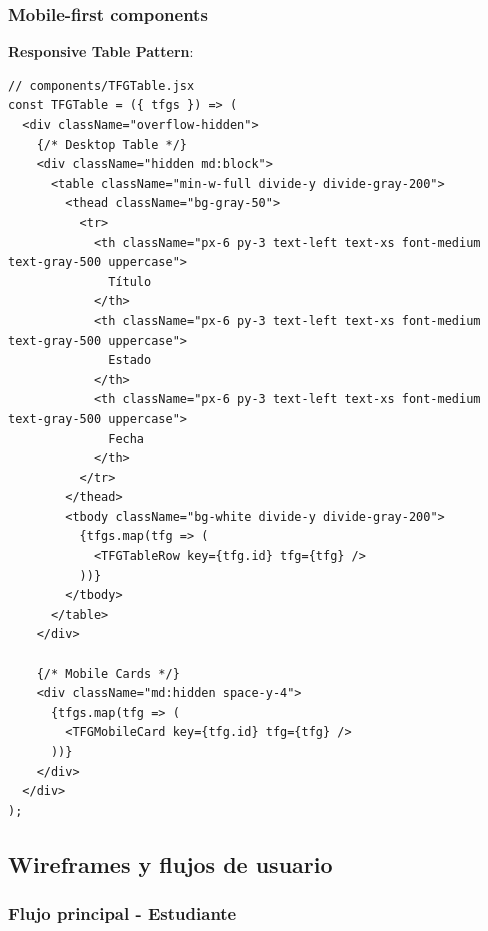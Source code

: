 \documentclass[12pt,a4paper,oneside]{report}
\begin{document}
\subsubsection{Mobile-first components}\label{mobile-first-components}

\textbf{Responsive Table Pattern}:

\begin{lstlisting}
// components/TFGTable.jsx
const TFGTable = ({ tfgs }) => (
  <div className="overflow-hidden">
    {/* Desktop Table */}
    <div className="hidden md:block">
      <table className="min-w-full divide-y divide-gray-200">
        <thead className="bg-gray-50">
          <tr>
            <th className="px-6 py-3 text-left text-xs font-medium text-gray-500 uppercase">
              Título
            </th>
            <th className="px-6 py-3 text-left text-xs font-medium text-gray-500 uppercase">
              Estado
            </th>
            <th className="px-6 py-3 text-left text-xs font-medium text-gray-500 uppercase">
              Fecha
            </th>
          </tr>
        </thead>
        <tbody className="bg-white divide-y divide-gray-200">
          {tfgs.map(tfg => (
            <TFGTableRow key={tfg.id} tfg={tfg} />
          ))}
        </tbody>
      </table>
    </div>
    
    {/* Mobile Cards */}
    <div className="md:hidden space-y-4">
      {tfgs.map(tfg => (
        <TFGMobileCard key={tfg.id} tfg={tfg} />
      ))}
    </div>
  </div>
);
\end{lstlisting}

\subsection{Wireframes y flujos de
usuario}\label{wireframes-y-flujos-de-usuario}

\subsubsection{Flujo principal -
Estudiante}\label{flujo-principal---estudiante}
\end{document}

